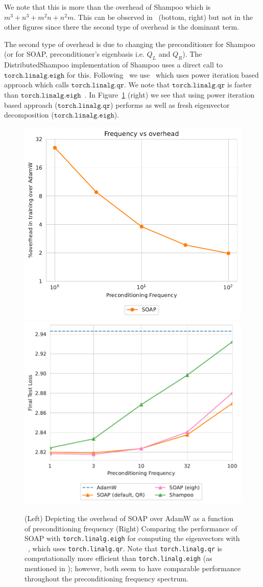\documentclass{article} %
\begin{document}
We note that this is more than the overhead of Shampoo which is $m^3+n^3+m^2n+n^2m$. This can be observed in~ (bottom, right) but not in the other figures since there the second type of overhead is the dominant term.

The second type of overhead is due to changing the preconditioner for Shampoo (or for SOAP, preconditioner's eigenbasis i.e. $Q_L$ and $Q_R$). The DistributedShampoo \citep{distributedshampoo} implementation of Shampoo uses a direct call to $\texttt{torch.linalg.eigh}$ for this. Following~\citet{4bitshampoo} we use~ which uses power iteration based approach which calls $\texttt{torch.linalg.qr}$. We note that $\texttt{torch.linalg.qr}$ is faster than $\texttt{torch.linalg.eigh}$~\citep{eigh-vs-qr}. In Figure~\ref{fig:linalg-runtime} (right) we see that using power iteration based approach ($\texttt{torch.linalg.qr}$) performs as well as fresh eigenvector decomposition ($\texttt{torch.linalg.eigh}$).


\label{app:linalg}
\begin{figure}[!h]
	\centering
	\includegraphics[width=.45\linewidth]{figures/freq_overhead.pdf}
	\includegraphics[width=.45\linewidth]{figures/freq_full.pdf}
	\caption{(Left) Depicting the overhead of SOAP over AdamW as a function of preconditioning frequency (Right) Comparing the performance of SOAP with \texttt{torch.linalg.eigh} for computing the eigenvectors with ~, which uses \texttt{torch.linalg.qr}. Note that \texttt{torch.linalg.qr} is computationally more efficient than \texttt{torch.linalg.eigh} (as mentioned in \citet{eigh-vs-qr}); however, both seem to have comparable performance throughout the preconditioning frequency spectrum.}
	\label{fig:linalg-runtime}
\end{figure}
\end{document}
